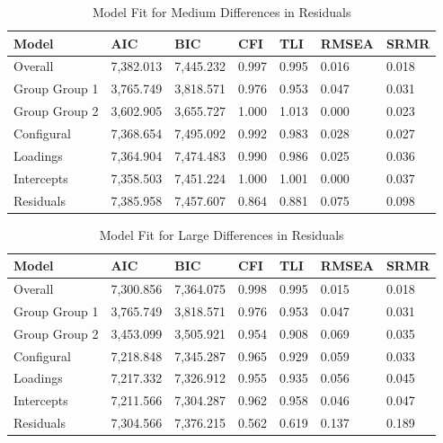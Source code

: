 \documentclass[
  man]{apa7}
\begin{document}
\begin{table}[tbp]

\begin{center}
\begin{threeparttable}

\caption{\label{tab:tab9}Model Fit for Medium Differences in Residuals}

\begin{tabular}{lllllll}
\toprule
Model & AIC & BIC & CFI & TLI & RMSEA & SRMR\\
\midrule
Overall & 7,382.013 & 7,445.232 & 0.997 & 0.995 & 0.016 & 0.018\\
Group Group 1 & 3,765.749 & 3,818.571 & 0.976 & 0.953 & 0.047 & 0.031\\
Group Group 2 & 3,602.905 & 3,655.727 & 1.000 & 1.013 & 0.000 & 0.023\\
Configural & 7,368.654 & 7,495.092 & 0.992 & 0.983 & 0.028 & 0.027\\
Loadings & 7,364.904 & 7,474.483 & 0.990 & 0.986 & 0.025 & 0.036\\
Intercepts & 7,358.503 & 7,451.224 & 1.000 & 1.001 & 0.000 & 0.037\\
Residuals & 7,385.958 & 7,457.607 & 0.864 & 0.881 & 0.075 & 0.098\\
\bottomrule
\end{tabular}

\end{threeparttable}
\end{center}

\end{table}

\begin{table}[tbp]

\begin{center}
\begin{threeparttable}

\caption{\label{tab:tab10}Model Fit for Large Differences in Residuals}

\begin{tabular}{lllllll}
\toprule
Model & AIC & BIC & CFI & TLI & RMSEA & SRMR\\
\midrule
Overall & 7,300.856 & 7,364.075 & 0.998 & 0.995 & 0.015 & 0.018\\
Group Group 1 & 3,765.749 & 3,818.571 & 0.976 & 0.953 & 0.047 & 0.031\\
Group Group 2 & 3,453.099 & 3,505.921 & 0.954 & 0.908 & 0.069 & 0.035\\
Configural & 7,218.848 & 7,345.287 & 0.965 & 0.929 & 0.059 & 0.033\\
Loadings & 7,217.332 & 7,326.912 & 0.955 & 0.935 & 0.056 & 0.045\\
Intercepts & 7,211.566 & 7,304.287 & 0.962 & 0.958 & 0.046 & 0.047\\
Residuals & 7,304.566 & 7,376.215 & 0.562 & 0.619 & 0.137 & 0.189\\
\bottomrule
\end{tabular}

\end{threeparttable}
\end{center}

\end{table}
\end{document}
